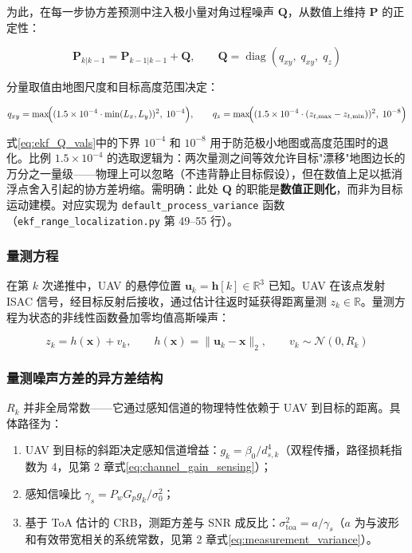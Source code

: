 为此，在每一步协方差预测中注入极小量对角过程噪声 $\mathbf{Q}$，从数值上维持 $\mathbf{P}$ 的正定性：

\begin{equation}
\boxed{\mathbf{P}_{k|k-1} = \mathbf{P}_{k-1|k-1} + \mathbf{Q}}, \qquad
\mathbf{Q} = \operatorname{diag}(q_{xy},\; q_{xy},\; q_z)
\label{eq:ekf_Q_def}
\end{equation}

分量取值由地图尺度和目标高度范围决定：

\begin{equation}
q_{xy} = \max\!\Bigl((1.5 \times 10^{-4} \cdot \min(L_x, L_y))^2,\; 10^{-4}\Bigr), \qquad
q_z = \max\!\Bigl((1.5 \times 10^{-4} \cdot (z_{t,\max} - z_{t,\min}))^2,\; 10^{-8}\Bigr)
\label{eq:ekf_Q_vals}
\end{equation}

式\eqref{eq:ekf_Q_vals}中的下界 $10^{-4}$ 和 $10^{-8}$ 用于防范极小地图或高度范围时的退化。比例 $1.5 \times 10^{-4}$ 的选取逻辑为：两次量测之间等效允许目标"漂移"地图边长的万分之一量级——物理上可以忽略（不违背静止目标假设），但在数值上足以抵消浮点舍入引起的协方差坍缩。需明确：此处 $\mathbf{Q}$ 的职能是\textbf{数值正则化}，而非为目标运动建模。对应实现为 \texttt{default\_process\_variance} 函数（\texttt{ekf\_range\_localization.py} 第 49--55 行）。

\subsubsection{量测方程}

在第 $k$ 次递推中，UAV 的悬停位置 $\mathbf{u}_k = \mathbf{h}[k] \in \mathbb{R}^3$ 已知。UAV 在该点发射 ISAC 信号，经目标反射后接收，通过估计往返时延获得距离量测 $z_k \in \mathbb{R}$。量测方程为状态的非线性函数叠加零均值高斯噪声：

\begin{equation}
z_k = h(\mathbf{x}) + v_k, \qquad
h(\mathbf{x}) = \|\mathbf{u}_k - \mathbf{x}\|_2, \qquad
v_k \sim \mathcal{N}(0, R_k)
\label{eq:ekf_meas}
\end{equation}

\subsubsection{量测噪声方差的异方差结构}

$R_k$ 并非全局常数——它通过感知信道的物理特性依赖于 UAV 到目标的距离。具体路径为：

\begin{enumerate}
    \item UAV 到目标的斜距决定感知信道增益：$g_k = \beta_0 / d_{s,k}^4$（双程传播，路径损耗指数为 4，见第 2 章式\eqref{eq:channel_gain_sensing}）；
    \item 感知信噪比 $\gamma_s = P_w G_p g_k / \sigma_0^2$；
    \item 基于 ToA 估计的 CRB，测距方差与 SNR 成反比：$\sigma_{\text{toa}}^2 = a / \gamma_s$（$a$ 为与波形和有效带宽相关的系统常数，见第 2 章式\eqref{eq:measurement_variance}）。
\end{enumerate}


